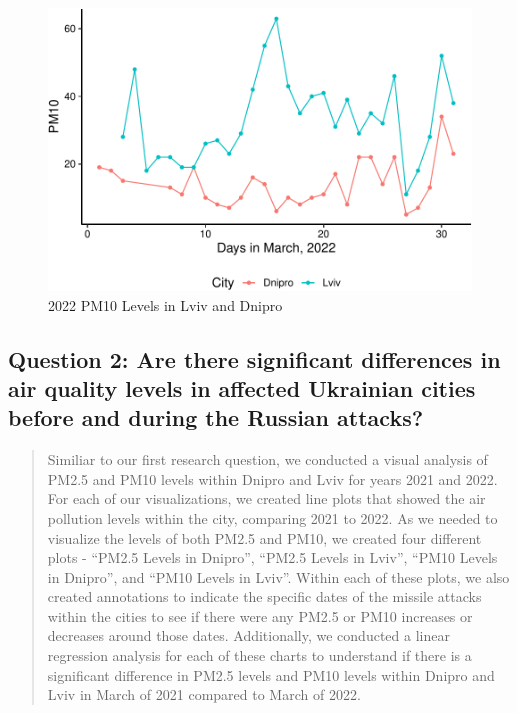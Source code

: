 \documentclass[
  12pt,
]{article}
\begin{document}
\begin{figure}
\centering
\includegraphics{Fontanie_Gordon_Weinberg_Project_files/figure-latex/Plotting Lviv and Dnipro PM10-1.pdf}
\caption{2022 PM10 Levels in Lviv and Dnipro}
\end{figure}

\newpage

\hypertarget{question-2-are-there-significant-differences-in-air-quality-levels-in-affected-ukrainian-cities-before-and-during-the-russian-attacks}{%
\subsection{Question 2: Are there significant differences in air quality
levels in affected Ukrainian cities before and during the Russian
attacks?}\label{question-2-are-there-significant-differences-in-air-quality-levels-in-affected-ukrainian-cities-before-and-during-the-russian-attacks}}

\begin{quote}
Similiar to our first research question, we conducted a visual analysis
of PM2.5 and PM10 levels within Dnipro and Lviv for years 2021 and 2022.
For each of our visualizations, we created line plots that showed the
air pollution levels within the city, comparing 2021 to 2022. As we
needed to visualize the levels of both PM2.5 and PM10, we created four
different plots - ``PM2.5 Levels in Dnipro'', ``PM2.5 Levels in Lviv'',
``PM10 Levels in Dnipro'', and ``PM10 Levels in Lviv''. Within each of
these plots, we also created annotations to indicate the specific dates
of the missile attacks within the cities to see if there were any PM2.5
or PM10 increases or decreases around those dates. Additionally, we
conducted a linear regression analysis for each of these charts to
understand if there is a significant difference in PM2.5 levels and PM10
levels within Dnipro and Lviv in March of 2021 compared to March of
2022.\\
\end{quote}
\end{document}
